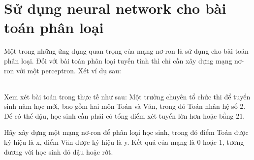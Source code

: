 \section{Sử dụng neural network cho bài toán phân loại}
\label{sec:classification}
Một trong những ứng dụng quan trọng của mạng nơ-ron là sử dụng cho bài toán phân loại. Đối với bài toán phân loại tuyến tính thì chỉ cần xây dựng mạng nơ-ron với một perceptron. Xét ví dụ sau:

\begin{exmp}
\label{example3}
\hrulefill\\
Xem xét bài toán trong thực tế như sau: Một trường chuyên tổ chức thi để tuyển sinh năm học mới, bao gồm hai môn Toán và Văn, trong đó Toán nhân hệ số 2. Để có thể đậu, học sinh cần phải có tổng điểm xét tuyển lớn hơn hoặc bằng 21.

Hãy xây dựng một mạng nơ-ron để phân loại học sinh, trong đó điểm Toán được ký hiệu là x, điểm Văn được ký hiệu là y. Kết quả của mạng là 0 hoặc 1, tương đương với học sinh đó đậu hoặc rớt.
\end{exmp}
